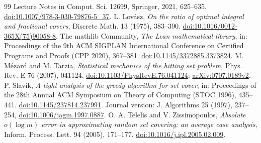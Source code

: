 \documentclass[11pt]{article}
\theoremstyle{remark}
\begin{document}
\begin{thebibliography}{99}
Lecture Notes in Comput. Sci. 12699, Springer, 2021, 625--635.
\href{https://doi.org/10.1007/978-3-030-79876-5_37}{doi:10.1007/978-3-030-79876-5\_37}.
 L. Lov\'asz, \emph{On the ratio of optimal integral and
fractional covers}, Discrete Math. 13 (1975), 383--390.
\href{https://doi.org/10.1016/0012-365X(75)90058-8}{doi:10.1016/0012-365X(75)90058-8}.
 The mathlib Community, \emph{The Lean mathematical
library}, in: Proceedings of the 9th ACM SIGPLAN International Conference
on Certified Programs and Proofs (CPP 2020), 367--381.
\href{https://doi.org/10.1145/3372885.3373824}{doi:10.1145/3372885.3373824}.
 M. M\'ezard and M. Tarzia, \emph{Statistical mechanics of the
hitting set problem}, Phys. Rev. E 76 (2007), 041124.
\href{https://doi.org/10.1103/PhysRevE.76.041124}{doi:10.1103/PhysRevE.76.041124};
\href{https://arxiv.org/abs/0707.0189v2}{arXiv:0707.0189v2}.
 P. Slav\'ik, \emph{A tight analysis of the greedy
algorithm for set cover}, in: Proceedings of the 28th Annual ACM Symposium on
Theory of Computing (STOC 1996), 435--441.
\href{https://doi.org/10.1145/237814.237991}{doi:10.1145/237814.237991}.
Journal version: J. Algorithms 25 (1997), 237--254,
\href{https://doi.org/10.1006/jagm.1997.0887}{doi:10.1006/jagm.1997.0887}.
 O. A. Telelis and V. Zissimopoulos, \emph{Absolute
$o(\log m)$ error in approximating random set covering: an average case
analysis}, Inform. Process. Lett. 94 (2005), 171--177.
\href{https://doi.org/10.1016/j.ipl.2005.02.009}{doi:10.1016/j.ipl.2005.02.009}.
\end{thebibliography}
\end{document}
